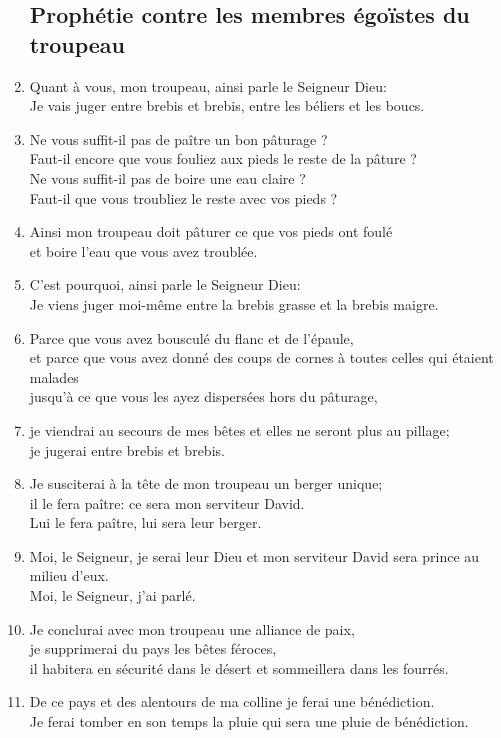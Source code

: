 \documentclass[12pt,a4paper,titlepage]{article}
\def \pslabelsep{0.2em} %
\def \psleftmargin{0em} %
\begin{document}
\begin{enumerate}[leftmargin=\psleftmargin, labelsep = \pslabelsep, label={\arabic*}, font=\color{\pscolor}\small\textsuperscript, parsep=0em, itemsep=0em, topsep=0em ]
\subsection*{Prophétie contre les membres égoïstes du troupeau}
 \item Quant à vous, mon troupeau, ainsi parle le Seigneur Dieu: \\ Je vais juger entre brebis et brebis, entre les béliers et les boucs.
\item Ne vous suffit-il pas de paître un bon pâturage ? \\ Faut-il encore que vous fouliez aux pieds le reste de la pâture ? \\ Ne vous suffit-il pas de boire une eau claire ? \\ Faut-il que vous troubliez le reste avec vos pieds ?
\item Ainsi mon troupeau doit pâturer ce que vos pieds ont foulé \\ et boire l’eau que vous avez troublée. \verseSpace
\item C’est pourquoi, ainsi parle le Seigneur Dieu: \\ Je viens juger moi-même entre la brebis grasse et la brebis maigre.
\item Parce que vous avez bousculé du flanc et de l’épaule, \\ et parce que vous avez donné des coups de cornes à toutes celles qui étaient malades \\ jusqu’à ce que vous les ayez dispersées hors du pâturage,
\item je viendrai au secours de mes bêtes et elles ne seront plus au pillage; \\ je jugerai entre brebis et brebis.
\item Je susciterai à la tête de mon troupeau un berger unique; \\ il le fera paître: ce sera mon serviteur David. \\ Lui le fera paître, lui sera leur berger.
\item Moi, le Seigneur, je serai leur Dieu et mon serviteur David sera prince au milieu d’eux. \\ Moi, le Seigneur, j’ai parlé.
\item Je conclurai avec mon troupeau une alliance de paix, \\ je supprimerai du pays les bêtes féroces, \\ il habitera en sécurité dans le désert et sommeillera dans les fourrés.
\item De ce pays et des alentours de ma colline je ferai une bénédiction. \\ Je ferai tomber en son temps la pluie qui sera une pluie de bénédiction.

\end{enumerate}
\end{document}
